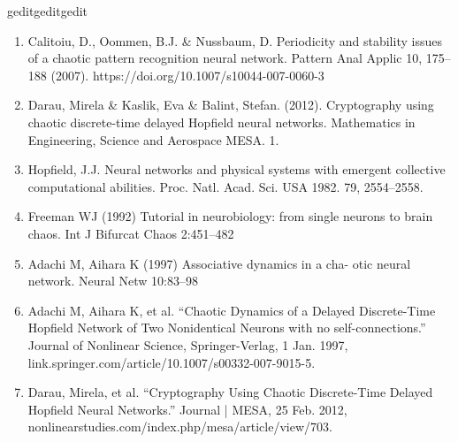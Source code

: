 geditgeditgedit\documentclass[12pt, letterpaper]{article}
\begin{document}
\begin{enumerate}[leftmargin=*]
    \item Calitoiu, D., Oommen, B.J. \& Nussbaum, D. Periodicity and stability issues of a chaotic pattern recognition neural network. Pattern Anal Applic 10, 175–188 (2007). https://doi.org/10.1007/s10044-007-0060-3
    \item Darau, Mirela \& Kaslik, Eva \& Balint, Stefan. (2012). Cryptography using chaotic discrete-time delayed Hopfield neural networks. Mathematics in Engineering, Science and Aerospace MESA. 1.
    \item Hopfield, J.J. Neural networks and physical systems with emergent collective computational abilities.
    Proc. Natl. Acad. Sci. USA 1982. 79, 2554–2558.
    \item Freeman WJ (1992) Tutorial in neurobiology: from single neurons to brain chaos. Int J Bifurcat Chaos 2:451–482
    \item Adachi M, Aihara K (1997) Associative dynamics in a cha- otic neural network. Neural Netw 10:83–98
    \item Adachi M, Aihara K, et al. “Chaotic Dynamics of a Delayed Discrete-Time Hopfield Network of Two Nonidentical Neurons with no self-connections.” Journal of Nonlinear Science, Springer-Verlag, 1 Jan. 1997, link.springer.com/article/10.1007/s00332-007-9015-5. 
    \item Darau, Mirela, et al. “Cryptography Using Chaotic Discrete-Time Delayed Hopfield Neural Networks.” Journal | MESA, 25 Feb. 2012, nonlinearstudies.com/index.php/mesa/article/view/703. 
\end{enumerate}
\end{document}

